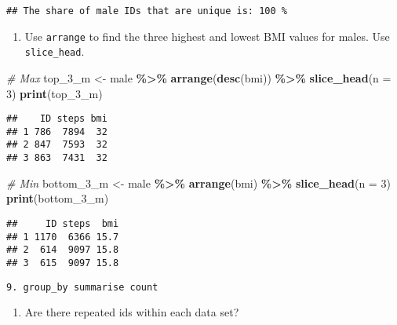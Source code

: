 \documentclass[
]{book}
\newenvironment{Shaded}{\begin{snugshade}}{\end{snugshade}}
\newcommand{\AttributeTok}[1]{\textcolor[rgb]{0.13,0.29,0.53}{#1}}
\newcommand{\CommentTok}[1]{\textcolor[rgb]{0.56,0.35,0.01}{\textit{#1}}}
\newcommand{\DecValTok}[1]{\textcolor[rgb]{0.00,0.00,0.81}{#1}}
\newcommand{\FunctionTok}[1]{\textcolor[rgb]{0.13,0.29,0.53}{\textbf{#1}}}
\newcommand{\NormalTok}[1]{#1}
\newcommand{\OtherTok}[1]{\textcolor[rgb]{0.56,0.35,0.01}{#1}}
\newcommand{\SpecialCharTok}[1]{\textcolor[rgb]{0.81,0.36,0.00}{\textbf{#1}}}
\providecommand{\tightlist}{%
  \setlength{\itemsep}{0pt}\setlength{\parskip}{0pt}}
\begin{document}
\begin{verbatim}
## The share of male IDs that are unique is: 100 %
\end{verbatim}

\begin{enumerate}
\def\labelenumi{\arabic{enumi}.}
\setcounter{enumi}{10}
\tightlist
\item
  Use \texttt{arrange} to find the three highest and lowest BMI values for males. Use \texttt{slice\_head}.
\end{enumerate}

\begin{Shaded}
\begin{Highlighting}[]
\CommentTok{\# Max}
\NormalTok{top\_3\_m }\OtherTok{\textless{}{-}}\NormalTok{ male }\SpecialCharTok{\%\textgreater{}\%}
  \FunctionTok{arrange}\NormalTok{(}\FunctionTok{desc}\NormalTok{(bmi)) }\SpecialCharTok{\%\textgreater{}\%}
  \FunctionTok{slice\_head}\NormalTok{(}\AttributeTok{n =} \DecValTok{3}\NormalTok{)}
\FunctionTok{print}\NormalTok{(top\_3\_m)}
\end{Highlighting}
\end{Shaded}

\begin{verbatim}
##    ID steps bmi
## 1 786  7894  32
## 2 847  7593  32
## 3 863  7431  32
\end{verbatim}

\begin{Shaded}
\begin{Highlighting}[]
\CommentTok{\# Min  }
\NormalTok{bottom\_3\_m }\OtherTok{\textless{}{-}}\NormalTok{ male }\SpecialCharTok{\%\textgreater{}\%}
  \FunctionTok{arrange}\NormalTok{(bmi) }\SpecialCharTok{\%\textgreater{}\%}
  \FunctionTok{slice\_head}\NormalTok{(}\AttributeTok{n =} \DecValTok{3}\NormalTok{)}
\FunctionTok{print}\NormalTok{(bottom\_3\_m)}
\end{Highlighting}
\end{Shaded}

\begin{verbatim}
##     ID steps  bmi
## 1 1170  6366 15.7
## 2  614  9097 15.8
## 3  615  9097 15.8
\end{verbatim}

\begin{verbatim}
9. group_by summarise count
\end{verbatim}

\begin{enumerate}
\def\labelenumi{\arabic{enumi}.}
\setcounter{enumi}{1}
\tightlist
\item
  Are there repeated ids within each data set?
\end{enumerate}
\end{document}
